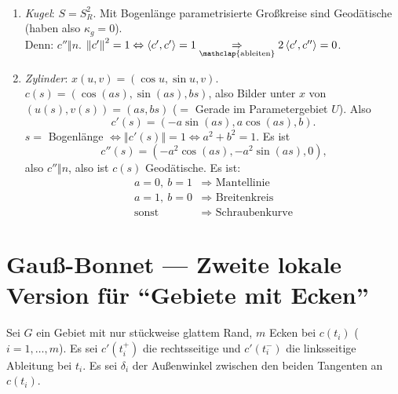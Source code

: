 \begin{example}[Geodätische]
  \
  \begin{enumerate}
    \item \emph{Kugel}: \( S = S_R^2 \). Mit Bogenlänge parametrisierte Großkreise sind Geodätische (haben also \( \kappa_g = 0 \)). \\
      Denn: \( c'' \Vert n \). \( \left\Vert c' \right\Vert^2 = 1 \Leftrightarrow \left\langle c', c' \right\rangle = 1 \underset{\mathclap{\text{ableiten}}}{\Rightarrow} 2\left\langle c', c'' \right\rangle = 0 \).
    
    \item \emph{Zylinder}: \( x(u,v) = \left( \cos u, \sin u, v \right) \). \\
      \( c(s) = \left( \cos(as),\sin(as),bs \right) \), also Bilder unter \( x \) von \( \left( u(s), v(s) \right) = (as, bs) \) (\( = \) Gerade im Parametergebiet \( U \)). Also
      \begin{equation*}
        c'(s) = \left( -a\sin (as), a\cos(as), b \right)\text{.}
      \end{equation*}
      \( s = \) Bogenlänge \( \Leftrightarrow \left\Vert c'(s) \right\Vert = 1 \Leftrightarrow a^2+b^2= 1 \). Es ist
      \begin{equation*}
        c''(s) = \left( -a^2\cos(as), -a^2\sin(as),0 \right)\text{,}
      \end{equation*}
      also \( c'' \Vert n \), also ist \( c(s) \) Geodätische. Es ist:
      \begin{align*}
        a = 0, \ b = 1 &\Rightarrow \text{ Mantellinie} \\
        a = 1, \ b = 0 &\Rightarrow \text{ Breitenkreis} \\
        \text{sonst } &\Rightarrow \text{ Schraubenkurve}
      \end{align*}
  \end{enumerate}
\end{example}

\section{Gauß-Bonnet --- Zweite lokale Version für ``Gebiete mit Ecken''}

Sei \( G \) ein Gebiet mit nur stückweise glattem Rand, \( m \) Ecken bei \( c(t_i) \) (\( i = 1,\dots,m \)). Es sei \( c'(t_i^+) \) die rechtsseitige und \( c'(t_i^-) \) die linksseitige Ableitung bei \( t_i \). Es sei \( \delta_i \) der Außenwinkel zwischen den beiden Tangenten an \( c(t_i) \).

